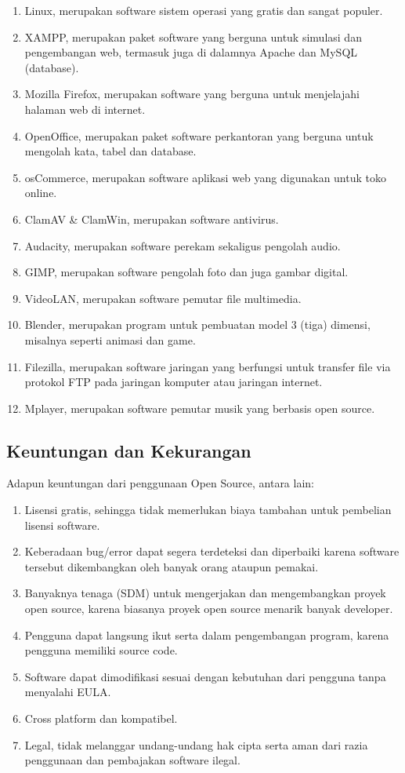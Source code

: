 \documentclass[../wastek.tex]{subfiles}
\begin{document}
\begin{enumerate}
	\item Linux, merupakan software sistem operasi yang gratis dan sangat populer.
	\item XAMPP, merupakan paket software yang berguna untuk simulasi dan pengembangan web, termasuk juga di dalamnya Apache dan MySQL (database).
	\item Mozilla Firefox, merupakan software yang berguna untuk menjelajahi halaman web di internet.
	\item OpenOffice, merupakan paket software perkantoran yang berguna untuk mengolah kata, tabel dan database.
	\item osCommerce, merupakan software aplikasi web yang digunakan untuk toko online.
	\item ClamAV \& ClamWin, merupakan software antivirus.
	\item Audacity, merupakan software perekam sekaligus pengolah audio.
	\item GIMP, merupakan software pengolah foto dan juga gambar digital.
	\item VideoLAN, merupakan software pemutar file multimedia.
	\item Blender, merupakan program untuk pembuatan model 3 (tiga) dimensi, misalnya seperti animasi dan game.
	\item Filezilla, merupakan software jaringan yang berfungsi untuk transfer file via protokol FTP pada jaringan komputer atau jaringan internet.
	\item Mplayer, merupakan software pemutar musik yang berbasis open source.
\end{enumerate}

\subsection{Keuntungan dan Kekurangan}%
\label{sub:Keuntungan dan Kekurangan}
Adapun keuntungan dari penggunaan Open Source, antara lain:
\begin{enumerate}
	\item Lisensi gratis, sehingga tidak memerlukan biaya tambahan untuk pembelian lisensi software.
	\item Keberadaan bug/error dapat segera terdeteksi dan diperbaiki karena software tersebut dikembangkan oleh banyak orang ataupun pemakai.
	\item Banyaknya tenaga (SDM) untuk mengerjakan dan mengembangkan proyek open source, karena biasanya proyek open source menarik banyak developer.
	\item Pengguna dapat langsung ikut serta dalam pengembangan program, karena pengguna memiliki source code.
	\item Software dapat dimodifikasi sesuai dengan kebutuhan dari pengguna tanpa menyalahi EULA.
	\item Cross platform dan kompatibel.
	\item Legal, tidak melanggar undang-undang hak cipta serta aman dari razia penggunaan dan pembajakan software ilegal.
\end{enumerate}
\end{document}

